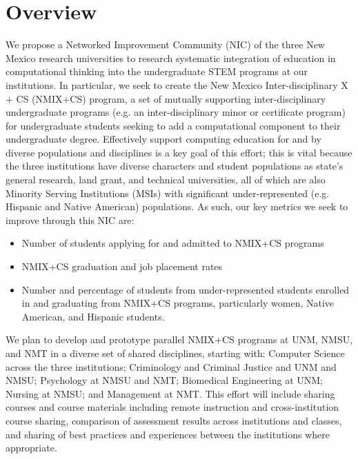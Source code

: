 \section{Overview}
\label{sec:overview}

We propose a Networked Improvement Community (NIC) of the three New Mexico research universities to research
systematic integration of education in computational thinking into the undergraduate STEM programs at our
institutions. In particular, we seek to create the New Mexico Inter-disciplinary X + CS (NMIX+CS) program,
a set of mutually supporting inter-disciplinary undergraduate programs (e.g. an inter-disciplinary minor or
certificate program) for undergraduate students seeking to add a computational component to their undergraduate
degree. Effectively support computing education for and by diverse populations
and disciplines is a key goal of this effort; this is vital because the three institutions have diverse
characters and student populations as state's general research, land grant, and technical universities, all of which
are also Minority Serving Institutions (MSIs) with significant under-represented (e.g. Hispanic
and Native American) populations. As such, our key metrics we seek to improve through this NIC are:
\begin{itemize}
\item Number of students applying for and admitted to NMIX+CS programs
\item NMIX+CS graduation and job placement rates
\item Number and percentage of students from under-represented students enrolled in and graduating from
  NMIX+CS programs, particularly women, Native American, and Hispanic students.
\end{itemize}

We plan to develop and prototype parallel NMIX+CS programs at UNM, NMSU, and NMT in a diverse set of shared disciplines,
starting with:
Computer Science across the three institutions; Criminology and Criminal Justice and UNM and NMSU; Psychology at NMSU and NMT; Biomedical Engineering at UNM; Nursing at NMSU; and Management at NMT.
This effort will include sharing courses and course materials including remote instruction and
cross-institution course sharing, comparison of assessment results across institutions and classes, and
sharing of best practices and  experiences between the institutions where appropriate.

